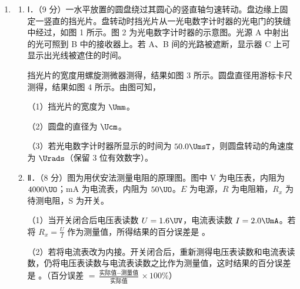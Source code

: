 \documentclass[\gkver]{gaokaozhenti}
\begin{document}
\begin{enumerate}
\item
\begin{enumerate}
	\item
	Ⅰ．（9 分）一水平放置的圆盘绕过其圆心的竖直轴匀速转动。盘边缘上固定一竖直的挡光片。盘转动时挡光片从一光电数字计时器的光电门的狭缝中经过，如图 1 所示。图 2 为光电数字计时器的示意图。光源 A 中射出的光可照到 B 中的接收器上。若 A、B 间的光路被遮断，显示器 C 上可显示出光线被遮住的时间。

	挡光片的宽度用螺旋测微器测得，结果如图 3 所示。圆盘直径用游标卡尺测得，结果如图 4 所示。由图可知，

	（1）挡光片的宽度为  $\Umm$。

	（2）圆盘的直径为  $\Ucm$。

	（3）若光电数字计时器所显示的时间为 $50.0\UmsT$，则圆盘转动的角速度为  $\Urads$（保留 3 位有效数字）。


	\item
	Ⅱ．（8 分）图为用伏安法测量电阻的原理图。图中 V 为电压表，内阻为 $4000\UO$；mA 为电流表，内阻为 $50\UO$。$E$ 为电源，$R$ 为电阻箱，$R_{x}$ 为待测电阻，S 为开关。

	（1）当开关闭合后电压表读数 $U=1.6\UV$，电流表读数 $I=2.0\UmA$。若将 $R_{x}=\frac{U}{I}$ 作为测量值，所得结果的百分误差是 。

	（2）若将电流表改为内接。开关闭合后，重新测得电压表读数和电流表读数，仍将电压表读数与电流表读数之比作为测量值，这时结果的百分误差是 。（百分误差 $=\frac{\text{实际值}-\text{测量值}}{\text{实际值}}\times100\%$）

\end{enumerate}


\end{enumerate}
\end{document}
